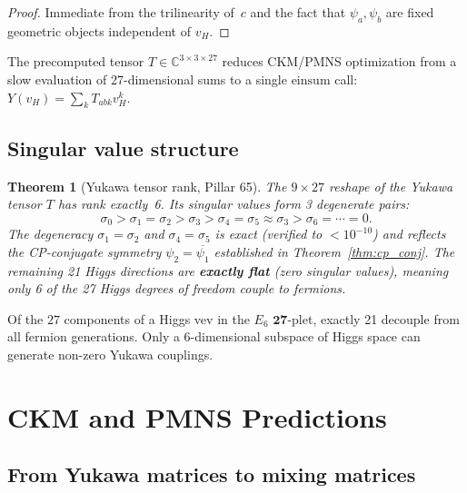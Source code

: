 \documentclass[11pt,a4paper]{article}
\newtheorem{theorem}{Theorem}[section]
\theoremstyle{definition}
\theoremstyle{remark}
\newcommand{\CC}{\mathbb{C}}
\begin{document}
\begin{proof}
Immediate from the trilinearity of~$c$ and the fact that $\psi_a, \psi_b$ are
fixed geometric objects independent of $v_H$.
\end{proof}

The precomputed tensor $T \in \CC^{3 \times 3 \times 27}$ reduces CKM/PMNS
optimization from a slow evaluation of 27-dimensional sums to a single
$\mathrm{einsum}$ call: $Y(v_H) = \sum_k T_{abk} v_H^k$.

\subsection{Singular value structure}

\begin{theorem}[Yukawa tensor rank, Pillar 65]\label{thm:yukawa_rank}
The $9 \times 27$ reshape of the Yukawa tensor $T$ has rank exactly~6.
Its singular values form 3 degenerate pairs:
\[
    \sigma_0 > \sigma_1 = \sigma_2 > \sigma_3 > \sigma_4 = \sigma_5 \approx \sigma_3 > \sigma_6 = \cdots = 0.
\]
The degeneracy $\sigma_1 = \sigma_2$ and $\sigma_4 = \sigma_5$ is exact
(verified to $< 10^{-10}$) and reflects the CP-conjugate symmetry
$\psi_2 = \overline{\psi_1}$ established in Theorem~\ref{thm:cp_conj}.
The remaining 21 Higgs directions are \textbf{exactly flat} (zero singular values),
meaning only 6 of the 27 Higgs degrees of freedom couple to fermions.
\end{theorem}

\begin{keyresult}
Of the $27$ components of a Higgs vev in the $E_6$ $\mathbf{27}$-plet,
exactly 21 decouple from all fermion generations.  Only a 6-dimensional
subspace of Higgs space can generate non-zero Yukawa couplings.
\end{keyresult}

\section{CKM and PMNS Predictions}\label{sec:ckm}

\subsection{From Yukawa matrices to mixing matrices}
\end{document}
